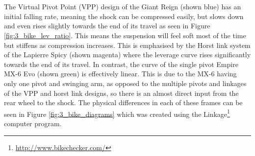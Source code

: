 		\\\\
		The Virtual Pivot Point (VPP) design of the Giant Reign (shown blue) has an initial falling rate, meaning the shock can be compressed easily, but slows down and even rises slightly towards the end of its travel as seen in Figure \ref{fig:3_bike_lev_ratio}. This means the suspension will feel soft most of the time but stiffens as compression increases. This is emphasised by the Horst link system of the Lapierre Spicy (shown magenta) where the leverage curve rises significantly towards the end of its travel. In contrast, the curve of the single pivot Empire MX-6 Evo (shown green) is effectively linear. This is due to the MX-6 having only one pivot and swinging arm, as opposed to the multiple pivots and linkages of the VPP and horst link designs, so there is an almost direct input from the rear wheel to the shock. The physical differences in each of these frames can be seen in Figure \ref{fig:3_bike_diagrams} which was created using the Linkage\footnote{\url{http://www.bikechecker.com/}} computer program.
